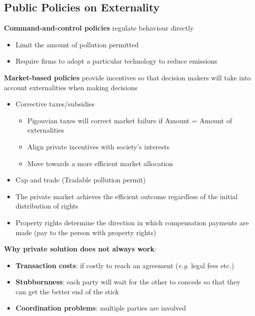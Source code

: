 \documentclass{article}
\newcommand{\eg}[0]{\textit{e.g. }}
\begin{document}
\begin{multicols}{2}
\subsection{Public Policies on Externality}
\textbf{Command-and-control policies} regulate behaviour directly
\begin{itemize}
	\item Limit the amount of pollution permitted
	\item Require firms to adopt a particular technology to reduce emissions
\end{itemize}
\textbf{Market-based policies} provide incentives so that decision makers will take into account externalities when making decisions
\begin{itemize}
	\item Corrective taxes/subsidies
	\begin{itemize}
		\item Pigouvian taxes will correct market failure if Amount = Amount of externalities
		\item Align private incentives with society's interests
		\item Move towards a more efficient market allocation
	\end{itemize}
	\item Cap and trade (Tradable pollution permit)
\end{itemize}
\vspace{1em}
\vspace{1em}
\begin{itemize}
	\item The private market achieves the efficient outcome regardless of the initial distribution of rights
	\item Property rights determine the direction in which compensation payments are made (pay to the person with property rights)
\end{itemize}
\vspace{1em}
\textbf{Why private solution does not always work}:
\begin{itemize}
	\item \textbf{Transaction costs}: if costly to reach an agreement (\eg legal fees etc.)
	\item \textbf{Stubbornness}: each party will wait for the other to concede so that they can get the better end of the stick
	\item \textbf{Coordination problems}: multiple parties are involved
\end{itemize}

\end{multicols}
\end{document}
